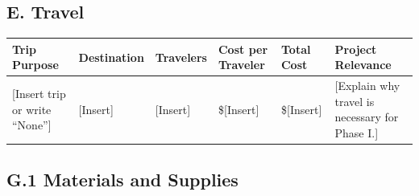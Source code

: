 \documentclass[11pt,letterpaper]{article}
\begin{document}
\subsection*{E. Travel}

\begin{table}[htbp]
\centering
\renewcommand{\arraystretch}{1.25}
\begin{tabularx}{\textwidth}{
    p{}
    p{}
    p{}
    p{}
    p{}
    X
}
\toprule
\textbf{Trip Purpose} &
\textbf{Destination} &
\textbf{Travelers} &
\textbf{Cost per Traveler} &
\textbf{Total Cost} &
\textbf{Project Relevance} \\
\midrule

[Insert trip or write ``None''] &
[Insert] &
[Insert] &
\$[Insert] &
\$[Insert] &
[Explain why travel is necessary for Phase I.] \\

\bottomrule
\end{tabularx}
\end{table}

\subsection*{G.1 Materials and Supplies}
\end{document}
